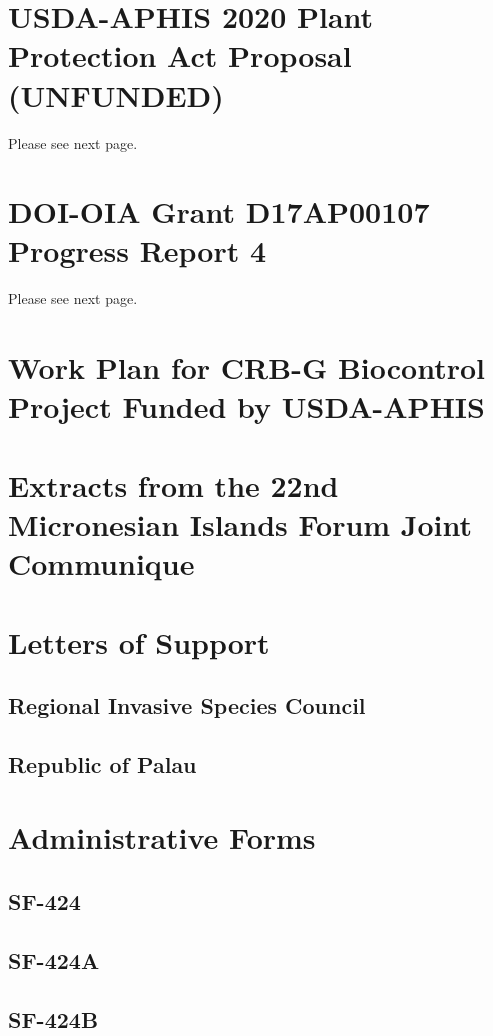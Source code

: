 \documentclass[12pt,letterpaper,english,bibliography=totocnumbered, abstract=on]{scrartcl}
\begin{document}
\section{USDA-APHIS 2020 Plant Protection Act Proposal (UNFUNDED)}
Please see next page.


\section{DOI-OIA Grant D17AP00107 Progress Report 4}
Please see next page.


\section{\label{sec:Work-Plan-for}Work Plan for CRB-G Biocontrol Project
Funded by USDA-APHIS}



\section{\label{sec:Extracts-from-the}Extracts from the 22nd Micronesian
Islands Forum Joint Communique}



\section{Letters of Support}

\subsection{Regional Invasive Species Council}



\subsection{Republic of Palau}

\section{Administrative Forms}

\subsection{SF-424}



\subsection{SF-424A}



\subsection{SF-424B}


\end{document}
